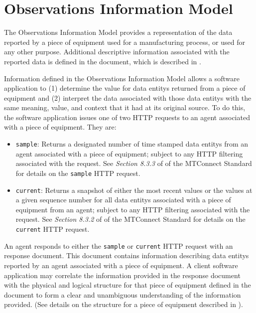 
\section{Observations Information Model}
\label{sec:Observations Information Model}

The \gls{Observations Information Model} provides a representation of the data reported by a piece of equipment used for a manufacturing process, or used for any other purpose.  Additional descriptive information associated with the reported data is defined in the  document, which is described in .

Information defined in the \gls{Observations Information Model} allows a software application to (1) determine the value for \glspl{data entity} returned from a piece of equipment and (2) interpret the data associated with those \glspl{data entity} with the same meaning, value, and context that it had at its original source.  To do this, the software application issues one of two HTTP requests to an \gls{agent} associated with a piece of equipment.  They are:



\begin{itemize}
    \item \texttt{sample}:  Returns a designated number of time stamped \glspl{data entity} from an \gls{agent} associated with a piece of equipment; subject to any HTTP filtering associated with the request.  See \textit{Section 8.3.3} of  of the MTConnect Standard for details on the \texttt{sample} HTTP request.

    \item \texttt{current}:  Returns a snapshot of either the most recent values or the values at a given sequence number for all \glspl{data entity} associated with a piece of equipment from an \gls{agent}; subject to any HTTP filtering associated with the request.  See \textit{Section 8.3.2} of  of the MTConnect Standard for details on the \texttt{current} HTTP request.


\end{itemize}

An \gls{agent} responds to either the \texttt{sample} or \texttt{current} HTTP request with an  \gls{response document}.  This document contains information describing \glspl{data entity} reported by an \gls{agent} associated with a piece of equipment.   A client software application may correlate the information provided in the  \gls{response document} with the physical and logical structure for that piece of equipment defined in the  document to form a clear and unambiguous understanding of the information provided.  (See details on the structure for a piece of equipment described in ).

